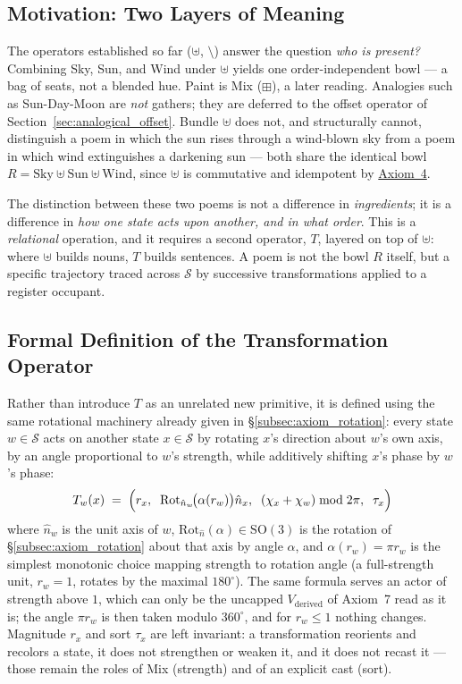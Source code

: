 \documentclass[12pt, a4paper]{article}
\begin{document}
\subsection{Motivation: Two Layers of Meaning}
\label{subsec:transform_motivation}
The operators established so far ($\uplus$, $\setminus$) answer the question
\emph{who is present?} Combining Sky, Sun, and Wind under $\uplus$
yields one order-independent bowl --- a bag of seats, not a blended
hue. Paint is Mix ($\boxplus$), a later reading. Analogies such as Sun-Day-Moon are \emph{not} gathers; they are deferred to the offset operator of Section~\ref{sec:analogical_offset}. Bundle $\uplus$ does not, and structurally
cannot, distinguish a poem in which the sun rises through a wind-blown
sky from a poem in which wind extinguishes a darkening sun --- both
share the identical bowl
$R = \text{Sky} \uplus \text{Sun} \uplus \text{Wind}$, since $\uplus$
is commutative and idempotent by \hyperref[subsec:axiom_idempotence]{Axiom~4}.

The distinction between these two poems is not a difference in
\emph{ingredients}; it is a difference in \emph{how one state acts
upon another, and in what order}. This is a \emph{relational}
operation, and it requires a second operator, $T$, layered on top of
$\uplus$: where $\uplus$ builds nouns, $T$ builds sentences. A poem is
not the bowl $R$ itself, but a specific trajectory traced across
$\mathcal{S}$ by successive transformations applied to a register occupant.

\subsection{Formal Definition of the Transformation Operator}
\label{subsec:transform_definition}
Rather than introduce $T$ as an unrelated new primitive, it is defined
using the same rotational machinery already given in
\S\ref{subsec:axiom_rotation}: every state $w \in \mathcal{S}$
acts on another state $x \in \mathcal{S}$ by rotating $x$'s direction
about $w$'s own axis, by an angle proportional to $w$'s strength, while
additively shifting $x$'s phase by $w$'s phase:
\begin{equation}
    T_w(x)
    \;=\;
    \Bigl(
        r_x,\;\;
        \mathrm{Rot}_{\hat n_w}\!\bigl(\alpha(r_w)\bigr)\hat n_x,\;\;
        (\chi_x + \chi_w) \bmod 2\pi,\;\;
        \tau_x
    \Bigr)
    \label{eq:transform_def}
\end{equation}
where $\hat n_w$ is the unit axis of $w$,
$\mathrm{Rot}_{\hat n}(\alpha) \in \mathrm{SO}(3)$ is the
rotation of \S\ref{subsec:axiom_rotation} about that axis by angle
$\alpha$, and $\alpha(r_w) = \pi r_w$ is the simplest monotonic choice
mapping strength to rotation angle (a full-strength unit, $r_w = 1$,
rotates by the maximal $180^\circ$). The same formula serves an actor of
strength above $1$, which can only be the uncapped $V_{\text{derived}}$ of
Axiom~7 read as it is; the angle $\pi r_w$ is then taken modulo $360^\circ$,
and for $r_w\le1$ nothing changes. Magnitude $r_x$ and sort $\tau_x$ are left invariant:
a transformation reorients and recolors a state, it does not
strengthen or weaken it, and it does not recast it --- those remain
the roles of Mix (strength) and of an explicit cast (sort).
\end{document}
